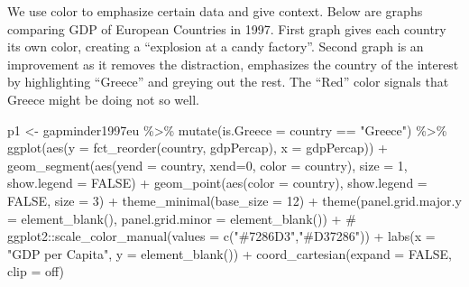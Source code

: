 \documentclass[
  letterpaper,
]{book}
\newenvironment{Shaded}{\begin{snugshade}}{\end{snugshade}}
\newcommand{\AttributeTok}[1]{\textcolor[rgb]{0.40,0.45,0.13}{#1}}
\newcommand{\CommentTok}[1]{\textcolor[rgb]{0.37,0.37,0.37}{#1}}
\newcommand{\ConstantTok}[1]{\textcolor[rgb]{0.56,0.35,0.01}{#1}}
\newcommand{\DecValTok}[1]{\textcolor[rgb]{0.68,0.00,0.00}{#1}}
\newcommand{\FunctionTok}[1]{\textcolor[rgb]{0.28,0.35,0.67}{#1}}
\newcommand{\NormalTok}[1]{\textcolor[rgb]{0.00,0.23,0.31}{#1}}
\newcommand{\OtherTok}[1]{\textcolor[rgb]{0.00,0.23,0.31}{#1}}
\newcommand{\SpecialCharTok}[1]{\textcolor[rgb]{0.37,0.37,0.37}{#1}}
\newcommand{\StringTok}[1]{\textcolor[rgb]{0.13,0.47,0.30}{#1}}
\begin{document}
We use color to emphasize certain data and give context. Below are
graphs comparing GDP of European Countries in 1997. First graph gives
each country its own color, creating a ``explosion at a candy factory''.
Second graph is an improvement as it removes the distraction, emphasizes
the country of the interest by highlighting ``Greece'' and greying out
the rest. The ``Red'' color signals that Greece might be doing not so
well.

\begin{Shaded}
\begin{Highlighting}[]
\NormalTok{p1 }\OtherTok{\textless{}{-}}\NormalTok{ gapminder1997eu }\SpecialCharTok{\%\textgreater{}\%} 
  \FunctionTok{mutate}\NormalTok{(}\AttributeTok{is.Greece =}\NormalTok{ country }\SpecialCharTok{==} \StringTok{"Greece"}\NormalTok{) }\SpecialCharTok{\%\textgreater{}\%}
  \FunctionTok{ggplot}\NormalTok{(}\FunctionTok{aes}\NormalTok{(}\AttributeTok{y =} \FunctionTok{fct\_reorder}\NormalTok{(country, gdpPercap), }\AttributeTok{x =}\NormalTok{ gdpPercap)) }\SpecialCharTok{+} 
  \FunctionTok{geom\_segment}\NormalTok{(}\FunctionTok{aes}\NormalTok{(}\AttributeTok{yend =}\NormalTok{ country, }\AttributeTok{xend=}\DecValTok{0}\NormalTok{, }\AttributeTok{color =}\NormalTok{ country), }\AttributeTok{size =} \DecValTok{1}\NormalTok{, }\AttributeTok{show.legend =} \ConstantTok{FALSE}\NormalTok{) }\SpecialCharTok{+}
  \FunctionTok{geom\_point}\NormalTok{(}\FunctionTok{aes}\NormalTok{(}\AttributeTok{color =}\NormalTok{ country), }\AttributeTok{show.legend =} \ConstantTok{FALSE}\NormalTok{, }\AttributeTok{size =} \DecValTok{3}\NormalTok{) }\SpecialCharTok{+} 
  \FunctionTok{theme\_minimal}\NormalTok{(}\AttributeTok{base\_size =} \DecValTok{12}\NormalTok{) }\SpecialCharTok{+} 
  \FunctionTok{theme}\NormalTok{(}\AttributeTok{panel.grid.major.y =} \FunctionTok{element\_blank}\NormalTok{(),}
        \AttributeTok{panel.grid.minor =} \FunctionTok{element\_blank}\NormalTok{()) }\SpecialCharTok{+}
 \CommentTok{\# ggplot2::scale\_color\_manual(values = c("\#7286D3","\#D37286")) +}
  \FunctionTok{labs}\NormalTok{(}\AttributeTok{x =} \StringTok{"GDP per Capita"}\NormalTok{, }\AttributeTok{y =} \FunctionTok{element\_blank}\NormalTok{()) }\SpecialCharTok{+} 
  \FunctionTok{coord\_cartesian}\NormalTok{(}\AttributeTok{expand =} \ConstantTok{FALSE}\NormalTok{, }\AttributeTok{clip =} \StringTok{\textquotesingle{}off\textquotesingle{}}\NormalTok{)}


\end{Highlighting}
\end{Shaded}
\end{document}
